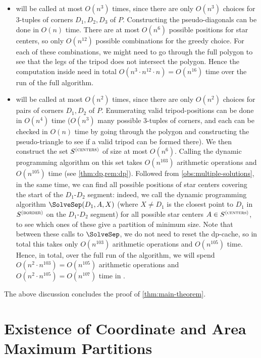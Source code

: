 \documentclass{theoretics}
\newcommand\Scen{S^{\textsc{(centers)}}}
\newcommand\Sbor{S^{\textsc{(border)}}}
\begin{document}
\begin{itemize}
\item \TripodGreedy{} will be called at most $O(n^3)$ times, since there are only $O(n^3)$ choices for 3-tuples of corners $D_1, D_2, D_3$ of $P$. Constructing the pseudo-diagonals can be done in $O(n)$ time. There are at most $O(n^6)$ possible positions for star centers, so only $O(n^{12})$ possible combinations for the greedy choice. For each of these combinations, we might need to go through the full polygon to see that the legs of the tripod does not intersect the polygon. Hence the computation inside \TripodGreedy{} need in total $O(n^3 \cdot n^{12} \cdot n) = O(n^{16})$ time over the run of the full algorithm.
\item \SolveSub{} will be called at most $O(n^2)$ times, since there are only $O(n^2)$ choices for pairs of corners $D_1, D_2$ of $P$. Enumerating valid tripod-positions can be done in $O(n^4)$ time ($O(n^3)$ many possible 3-tuples of corners, and each can be checked in $O(n)$ time  by going through the polygon and constructing the pseudo-triangle to see if a valid tripod can be formed there). We then construct the set $\Scen$ of size at most $O(n^6)$. Calling the dynamic programming algorithm on this set takes $O(n^{103})$ arithmetic operations and $O(n^{105})$ time (see \cref{thm:dp,rem:dp}). Followed from \cref{obs:multiple-solutions}, in the same time, we can find all possible positions of star centers covering the start of the $D_1$-$D_2$ segment: indeed, we call the dynamic programming algorithm $\SolveSep(D_1,A,X)$ (where $X \neq D_1$ is the closest point to $D_1$ in $\Sbor$ on the $D_1$-$D_2$ segment) for all possible star centers $A\in \Scen$, to see which ones of these give a partition of minimum size. Note that between these calls to $\SolveSep$, we do not need to reset the dp-cache, so in total this takes only $O(n^{103})$ arithmetic operations and $O(n^{105})$ time.
Hence, in total, over the full run of the algorithm, we will spend $O(n^2 \cdot n^{103}) = O(n^{105})$ arithmetic operations and $O(n^2 \cdot n^{105}) = O(n^{107})$ time in \SolveSub.
\end{itemize}
The above discussion concludes the proof of \cref{thm:main-theorem}.



\newpage
\printbibliography%


\appendix



\newpage
\section{Existence of Coordinate and Area Maximum Partitions}
\label{apx:existence}
\end{document}
